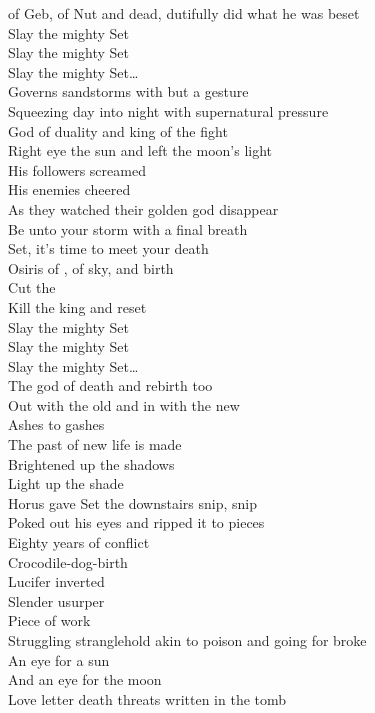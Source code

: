  of Geb, of Nut and dead, dutifully did what he was beset \\

Slay the mighty Set \\
Slay the mighty Set \\
Slay the mighty Set… \\

Governs sandstorms with but a gesture \\
Squeezing day into night with supernatural pressure \\
God of duality and king of the fight \\
Right eye the sun and left the moon's light \\
His followers screamed \\
His enemies cheered \\
As they watched their golden god disappear \\
Be unto your storm with a final breath \\
Set, it's time to meet your death \\

Osiris of , of sky, and birth \\
Cut the  \\
Kill the king and reset \\

Slay the mighty Set \\
Slay the mighty Set \\
Slay the mighty Set… \\

The god of death and rebirth too \\
Out with the old and in with the new \\
Ashes to gashes \\
The past of new life is made \\
Brightened up the shadows \\
Light up the shade \\
Horus gave Set the downstairs snip, snip \\
Poked out his eyes and ripped it to pieces \\
Eighty years of conflict \\
Crocodile-dog-birth \\
Lucifer inverted \\
Slender usurper \\
Piece of work \\
Struggling stranglehold akin to poison and going for broke \\
An eye for a sun \\
And an eye for the moon \\
Love letter death threats written in the tomb \\

